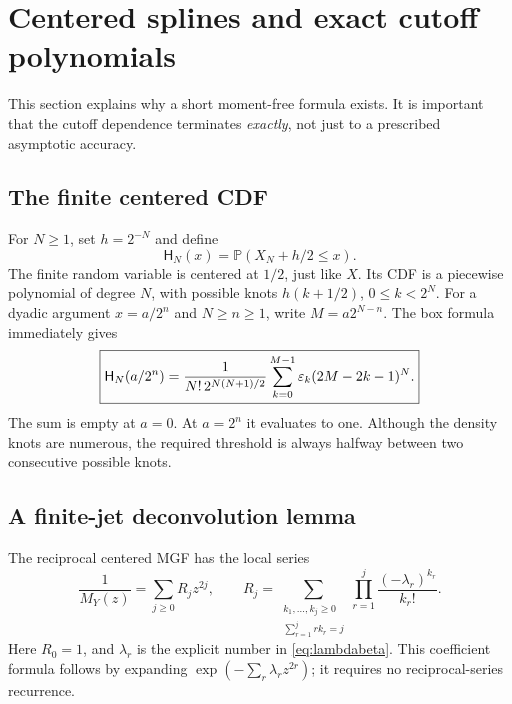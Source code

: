 \documentclass[11pt,oneside]{article}
\theoremstyle{definition}\newtheorem{definition}[theorem]{Definition}
\theoremstyle{remark}\newtheorem{remark}[theorem]{Remark}
\newcommand{\Prob}{\mathbb P}\newcommand{\Up}{\operatorname{up}}
\begin{document}
\section{Centered splines and exact cutoff polynomials}
\label{sec:cutoff}

This section explains why a short moment-free formula exists. It is important
that the cutoff dependence terminates \emph{exactly}, not just to a prescribed
asymptotic accuracy.

\subsection{The finite centered CDF}
For $N\ge1$, set $h=2^{-N}$ and define
\begin{equation}
 \mathsf H_N(x)=\Prob(X_N+h/2\le x).
 \label{eq:centeredCDF}
\end{equation}
The finite random variable is centered at $1/2$, just like $X$.
Its CDF is a piecewise polynomial of degree $N$, with possible knots
$h(k+1/2)$, $0\le k<2^N$. For a dyadic argument $x=a/2^n$ and $N\ge n\ge1$,
write $M=a2^{N-n}$. The box formula immediately gives
\begin{equation}
 \boxed{\displaystyle
 \mathsf H_N(a/2^n)=
 \frac{1}{N!\,2^{N(N+1)/2}}
 \sum_{k=0}^{M-1}\varepsilon_k(2M-2k-1)^N.}
 \label{eq:centeredCDFexplicit}
\end{equation}
The sum is empty at $a=0$. At $a=2^n$ it evaluates to one.
Although the density knots are numerous, the required threshold is always
halfway between two consecutive possible knots.

\subsection{A finite-jet deconvolution lemma}
The reciprocal centered MGF has the local series
\begin{equation}
 \frac{1}{M_Y(z)}=\sum_{j\ge0}R_jz^{2j},\qquad
 R_j=\sum_{\substack{k_1,\ldots,k_j\ge0\\\sum_{r=1}^jrk_r=j}}
      \prod_{r=1}^{j}\frac{(-\lambda_r)^{k_r}}{k_r!}.
 \label{eq:reciprocal}
\end{equation}
Here $R_0=1$, and $\lambda_r$ is the explicit number in
\eqref{eq:lambdabeta}. This coefficient formula follows by expanding
$\exp(-\sum_r\lambda_rz^{2r})$; it requires no reciprocal-series recurrence.
\end{document}
